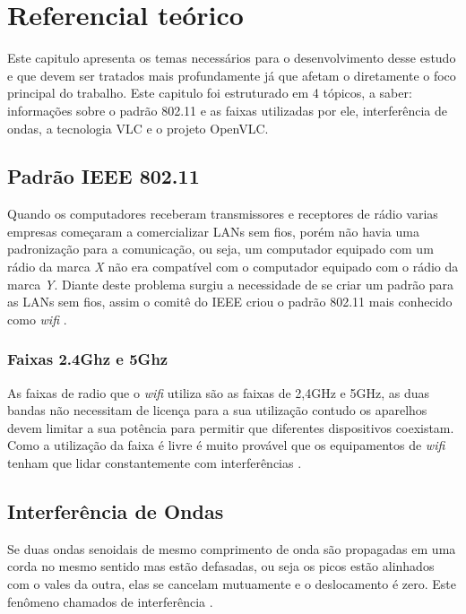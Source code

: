 \chapter{Referencial teórico}

Este capitulo apresenta os temas necessários para o desenvolvimento desse estudo e que devem ser tratados mais profundamente já que afetam o diretamente o foco principal do trabalho. Este capitulo foi estruturado em 4 tópicos, a saber: informações sobre o padrão 802.11 e as faixas utilizadas por ele, interferência de ondas, a tecnologia VLC e o projeto OpenVLC.

\section{Padrão IEEE 802.11}

Quando os computadores receberam transmissores e receptores de rádio varias empresas começaram a comercializar LANs sem fios, porém não havia uma padronização para a comunicação, ou seja, um computador equipado com um rádio da marca \emph{X} não era compatível com o computador equipado com o rádio da marca \emph{Y}. Diante deste problema surgiu a necessidade de se criar um padrão para as LANs sem fios, assim o comitê do IEEE criou o padrão 802.11 mais conhecido como \textit{wifi} \cite{tanenbaum}.

\subsection{Faixas 2.4Ghz e 5Ghz}

As faixas de radio que o \textit{wifi} utiliza são as faixas de 2,4GHz e 5GHz, as duas bandas não necessitam de licença para a sua utilização contudo os aparelhos devem limitar a sua potência para permitir que diferentes dispositivos coexistam. Como a utilização da faixa é livre é muito provável que os equipamentos de \textit{wifi} tenham que lidar constantemente com interferências \cite{tanenbaum}.

\section{Interferência de Ondas}

Se duas ondas senoidais de mesmo comprimento de onda são propagadas em uma corda no mesmo sentido mas estão defasadas, ou seja os picos estão alinhados com o vales da outra, elas se cancelam mutuamente e o deslocamento é zero. Este fenômeno chamados de interferência \cite{fisica}. 

